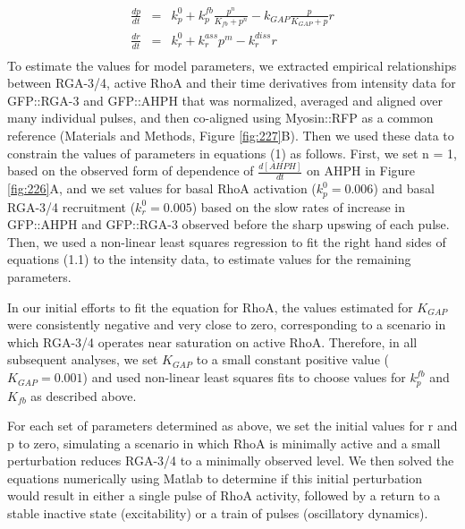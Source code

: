 \begin{align}
\begin{split}
  \begin{array}{rcl} \frac{dp}{dt} & = & k_{p}^0 + k_{p}^{fb}\frac{p^n}{K_{fb} + p^n} - k_{GAP}\frac{p}{K_{GAP} + p}r \\ 
\frac{dr}{dt} & = & k_{r}^0 + k_{r}^{ass}p^m - k_{r}^{diss}r  \end{array}
\end{split}
\end{align}
To estimate the values for model parameters, we extracted empirical relationships between RGA-3/4, active RhoA and their time derivatives from intensity data for GFP::RGA-3 and GFP::AHPH that was normalized, averaged and aligned over many individual pulses, and then co-aligned using Myosin::RFP as a common reference (Materials and Methods, Figure \ref{fig:227}B). Then we used these data to constrain the values of parameters in equations (1) as follows.  First,  we set n = 1, based on the observed form of dependence of $\frac{d[AHPH]}{dt}$ on AHPH in Figure \ref{fig:226}A, and  we set values for basal  RhoA activation ($k_{p}^0 = 0.006$) and basal RGA-3/4 recruitment ($k_{r}^0 = 0.005$) based on the slow rates of increase in GFP::AHPH and GFP::RGA-3 observed before the sharp upswing of each pulse. Then, we used a non-linear least squares regression to fit the right hand sides of equations (1.1) to the intensity data, to estimate values for the remaining parameters.  



In our initial efforts to fit the equation for RhoA, the values estimated for $K_{GAP}$ were consistently negative and very close to zero,  corresponding to a scenario in which RGA-3/4 operates near saturation on active RhoA. Therefore, in all subsequent analyses, we set $K_{GAP}$ to a small constant positive value ($K_{GAP}=0.001$) and used non-linear least squares fits to choose values for $k_{p}^{fb}$ and $K_{fb}$ as described above.


For each set of parameters determined as above, we set the initial values for r and p to zero,  simulating a scenario in which RhoA is minimally active and a small perturbation reduces RGA-3/4 to a minimally observed level. We then solved the equations numerically using Matlab to determine if this initial perturbation would result in either a single pulse of RhoA activity, followed by a return to a stable inactive state (excitability) or a train of pulses (oscillatory dynamics).  





